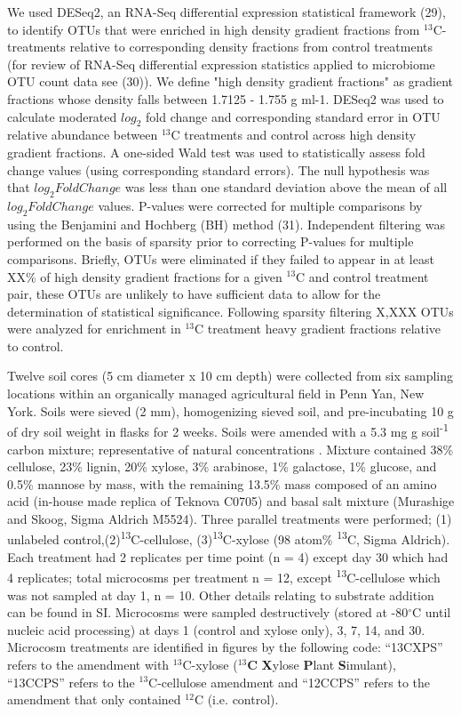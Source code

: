 We used DESeq2, an RNA-Seq differential expression statistical framework (29),
to identify OTUs that were enriched in  high density gradient fractions from
$^{13}$C-treatments relative to corresponding density fractions from control
treatments (for review of RNA-Seq differential expression statistics applied to
microbiome OTU count data see (30)). We define "high density gradient
fractions" as gradient fractions whose density falls between 1.7125 - 1.755
g ml-1. DESeq2 was used to calculate moderated $log_{2}$ fold change and
corresponding standard error in OTU relative abundance between $^{13}$C
treatments and control across high density gradient fractions. A one-sided Wald
test was used to statistically assess fold change values (using corresponding
standard errors). The null hypothesis was that $log_{2} Fold Change$ was less
than one standard deviation above the mean of all $log_{2} Fold Change$ values.
P-values were corrected for multiple comparisons by using the Benjamini and
Hochberg (BH) method (31). Independent filtering was performed on the basis of
sparsity prior to correcting P-values for multiple comparisons. Briefly, OTUs
were eliminated if they failed to appear in at least XX\% of high density
gradient fractions for a given $^{13}$C and control treatment pair, these OTUs
are unlikely to have sufficient data to allow for the determination of
statistical significance. Following sparsity filtering X,XXX OTUs were analyzed
for enrichment in $^{13}$C treatment heavy gradient fractions relative to
control.

Twelve soil cores (5 cm diameter x 10 cm depth) were collected from six 
sampling locations within an organically managed agricultural field in Penn
Yan, New York. Soils were sieved (2 mm), homogenizing sieved soil, and
pre-incubating 10 g of dry soil weight in flasks for 2 weeks. Soils were
amended with a 5.3 mg g soil\textsuperscript{-1} carbon mixture; representative
of natural concentrations \cite{Schneckenberger_2008}. Mixture contained 38\%
cellulose, 23\% lignin, 20\% xylose, 3\% arabinose, 1\% galactose, 1\% glucose,
and 0.5\% mannose by mass, with the remaining 13.5\% mass composed of an amino
acid (in-house made replica of Teknova C0705) and basal salt mixture (Murashige
and Skoog, Sigma Aldrich M5524). Three parallel treatments were performed; (1)
unlabeled control,(2)\textsuperscript{13}C-cellulose,
(3)\textsuperscript{13}C-xylose (98 atom\% \textsuperscript{13}C, Sigma
Aldrich). Each treatment had 2 replicates per time point (n = 4) except day 30
which had 4 replicates; total microcosms per treatment n = 12, except
\textsuperscript{13}C-cellulose which was not sampled at day 1, n = 10. Other
details relating to substrate addition can be found in SI. Microcosms were
sampled destructively (stored at -80$^{\circ}$C until nucleic acid processing)
at days 1 (control and xylose only), 3, 7, 14, and 30. Microcosm treatments are
identified in figures by the following code: ``13CXPS'' refers to the amendment
with $^{13}$C-xylose ($^{13}$\textbf{C} \textbf{X}ylose \textbf{P}lant
\textbf{S}imulant), ``13CCPS'' refers to the $^{13}$C-cellulose amendment and
``12CCPS'' refers to the amendment that only contained $^{12}$C (i.e. control).

